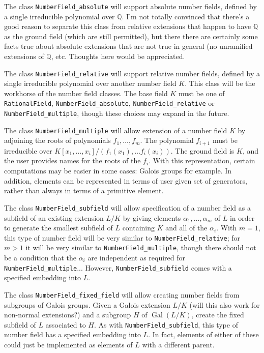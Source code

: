 \documentclass[12pt]{article}
\providecommand{\Gal}{\operatorname{Gal}}
\begin{document}
The class \texttt{NumberField\_absolute} will support absolute number fields, defined by a single irreducible polynomial over $\mathbb{Q}$.  I'm not totally convinced that there's a good reason to separate this class from relative extensions that happen to have $\mathbb{Q}$ as the ground field (which are still permitted), but there there are certainly some facts true about absolute extensions that are not true in general (no unramified extensions of $\mathbb{Q}$, etc.  Thoughts here would be appreciated.

The class \texttt{NumberField\_relative} will support relative number fields, defined by a single irreducible polynomial over another number field $K$.  This class will be the workhorse of the number field classes.  The base field $K$ must be one of \texttt{RationalField}, \texttt{NumberField\_absolute}, \texttt{NumberField\_relative} or \texttt{NumberField\_multiple}, though these choices may expand in the future.  

The class \texttt{NumberField\_multiple} will allow extension of a number field $K$ by adjoining the roots of polynomials $f_1, \ldots, f_m$.  The polynomial $f_{i+1}$ must be irreducible over $K[x_1, \ldots, x_i] / (f_1(x_1), \dots f_i(x_i))$.  The ground field is $K$, and the user provides names for the roots of the $f_i$.  With this representation, certain computations may be easier in some cases: Galois groups for example.  In addition, elements can be represented in terms of user given set of generators, rather than always in terms of a primitive element.

The class \texttt{NumberField\_subfield} will allow specification of a number field as a subfield of an existing extension $L/K$ by giving elements $\alpha_1, \ldots, \alpha_m$  of $L$ in order to generate the smallest subfield of $L$ containing $K$ and all of the $\alpha_i$.  With $m = 1$, this type of number field will be very similar to \texttt{NumberField\_relative}; for $m > 1$ it will be very similar to \texttt{NumberField\_multiple}, though there should not be a condition that the $\alpha_i$ are independent as required for \texttt{NumberField\_multiple}...  However, \texttt{NumberField\_subfield} comes with a specified embedding into $L$.  

The class \texttt{NumberField\_fixed\_field} will allow creating number fields from subgroups of Galois groups.  Given a Galois extension $L/K$ (will this also work for non-normal extensions?) and a subgroup $H$ of $\Gal(L/K)$, create the fixed subfield of $L$ associated to $H$.  As with \texttt{NumberField\_subfield}, this type of number field has a specified embedding into $L$.  In fact, elements of either of these could just be implemented as elements of $L$ with a different parent.
\end{document}
